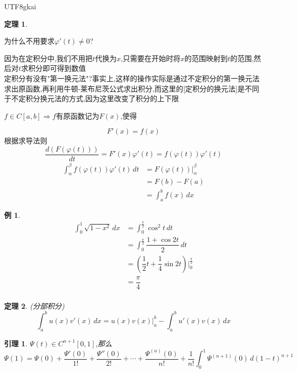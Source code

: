 \documentclass{article}
\newtheorem{theorem}{定理}[subsection]
\newtheorem{lemma}{引理}[subsection]
\newtheorem{example}{例}[subsection]
\newenvironment{cproof}{%
\heiti{证明}\kaishu
}{%
}
\begin{document}
\begin{CJK}{UTF8}{gkai}
\begin{theorem}
\end{theorem}
为什么不用要求$\varphi'(t) \neq 0$?

因为在定积分中,我们不用把$t$代换为$x$,只需要在开始时将$x$的范围映射到$t$的范围,然后对$t$求积分即可得到数值\\

定积分有没有"第一换元法"?事实上,这样的操作实际是通过不定积分的第一换元法求出原函数,再利用牛顿-莱布尼茨公式求出积分,而这里的[定积分的换元法]是不同于不定积分换元法的方式,因为这里改变了积分的上下限\\
\begin{cproof}
$f\in C[a,b] \Rightarrow f$有原函数记为$F(x)$,使得

\[F'(x) = f(x)\]
根据求导法则
\[\dfrac{d(F(\varphi(t)))}{dt} = F'(x)\varphi'(t) = f(\varphi(t))\varphi'(t)\]
\[
\begin{aligned}
\int_{\alpha}^{\beta}f(\varphi(t))\varphi'(t)\,dt &= F(\varphi(t))|_{\alpha}^{\beta}\\
&=F(b) - F(a)\\
&=\int_{a}^{b}f(x)\,dx 
\end{aligned}
\]
\end{cproof}

\begin{example}
  \[
  \begin{aligned}
  \int_{0}^{1}\sqrt{1 - x^2}\, dx &= \int_{0}^{\frac{\pi}{2}} \cos^2 t \, dt\\
  &=\int_{0}^{\frac{\pi}{2}} \dfrac{1 + \cos 2t}{2} \, dt\\
  &=\left(\dfrac{1}{2}t + \dfrac{1}{4}\sin 2t\right)\Big\vert_0^{\frac{\pi}{2}}\\
  &=\dfrac{\pi}{4}\\
  \end{aligned}
  \]
\end{example}
\begin{theorem}
  (分部积分)
  \[\int_{a}^{b}u(x)v'(x)\,dx = u(x)v(x)|_a ^b-\int_{a}^{b}u'(x)v(x)\,dx \]
\end{theorem}

\begin{lemma}
  $\varPsi(t) \in C^{n + 1}[0,1]$,那么
  \[\varPsi(1) = \varPsi(0) + \dfrac{\varPsi'(0)}{1!} +\dfrac{\varPsi''(0)}{2!}+\cdots +\dfrac{\varPsi^{(n)}(0)}{n!} + \dfrac{1}{n!}\int_{0}^{1}\varPsi^{(n + 1)}(0)\, d{(1 - t)^{n + 1}}\]

\end{lemma}


\end{CJK}
\end{document}
